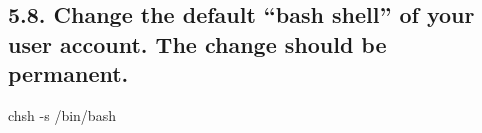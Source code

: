 \documentclass[11pt,a4]{article}
\begin{document}
\subsection*{5.8. Change the default “bash shell” of your user account. The change should be permanent.}
chsh -s /bin/bash
% 	
%
%
%
%
\end{document}
